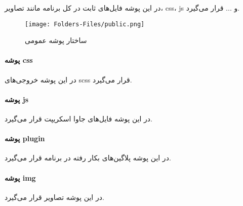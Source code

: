 در این پوشه فایل‌های ثابت در کل برنامه مانند تصاویر، css، js و ... قرار می‌گیرد.

\begin{figure}[H]
	\texttt{[image: Folders-Files/public.png]}
	\centering
	\caption{ساختار پوشه عمومی}
	\label{fig:folder-public}
\end{figure}

\paragraph{پوشه css}
در این پوشه خروجی‌های scss قرار می‌گیرد.

\paragraph{پوشه js}
در این پوشه فایل‌های جاوا اسکریپت قرار می‌گیرد.

\paragraph{پوشه plugin}
در این پوشه پلاگین‌های بکار رفته در برنامه قرار می‌گیرد.

\paragraph{پوشه img}
در این پوشه تصاویر قرار می‌گیرد.
